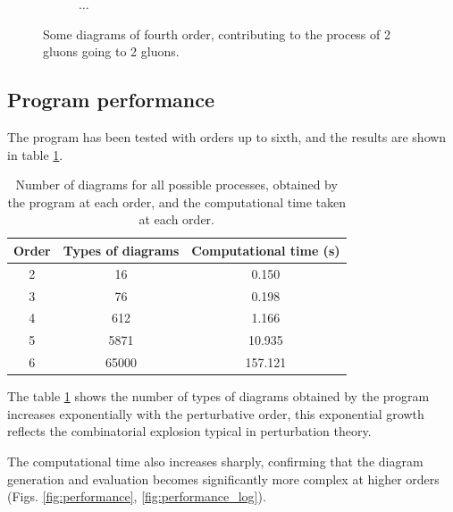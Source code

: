 \documentclass[11pt,a4paper,twoside,pdf]{article}
\numberwithin{equation}{section}
\begin{document}
\begin{figure}[h!]
\begin{subfigure}[t]{0.16\textwidth}
    \end{subfigure}
    \hfill
    \begin{subfigure}[t]{0.1\textwidth}
        \centering
        {\LARGE $\ldots$}
    \end{subfigure}
    \hfill
    \caption{Some diagrams of fourth order, contributing to the process of 
    2 gluons going to 2 gluons.}
    \label{fig:order4_2to2}
\end{figure}

\newpage


\subsection{Program performance}

 The program has been tested with orders up to sixth, and the results are shown in table 
 \ref{tab:time_diagrams}.

\begin{table} [h!]
    \centering
    \begin{tabular}{|c|c|c|}
        \hline
        Order & Types of diagrams & Computational time (s)\\
        \hline
        2  & 16 & 0.150\\
        3  & 76 & 0.198\\
        4  & 612 & 1.166\\
        5  & 5871  & 10.935\\
        6  & 65000  & 157.121\\
        \hline
    \end{tabular}
    \caption{Number of diagrams for all possible processes, obtained by the program 
    at each order, and the computational time taken at each order.}
    \label{tab:time_diagrams}
\end{table}

The table \ref{tab:time_diagrams} shows the number of types of diagrams obtained by
the program increases exponentially with the perturbative order, this exponential growth
reflects the combinatorial explosion typical in perturbation theory.

The computational time also increases sharply, confirming that the diagram generation
and evaluation becomes significantly more complex at higher orders 
(Figs. \ref{fig:performance}, \ref{fig:performance_log}).
\end{document}
